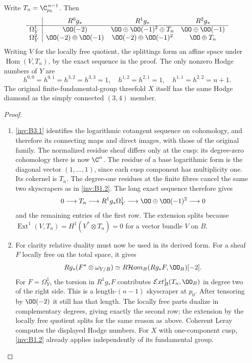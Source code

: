 \begin{proposition}\hypertarget{tag-01S8}{}\label{inv:B3.2}

Write $T_n=\C_{p_0}^{\,n-1}$. Then
\[
\begin{array}{c|ccc}
 &R^0g_*&R^1g_*&R^2g_*\\\hline
\Omega^1_Y&\OO(-2)&\OO\oplus\OO(-1)^2\oplus T_n&\OO\oplus\OO(-1)\\
\Omega^2_Y&\OO(-2)\oplus\OO(-1)&\OO(-2)\oplus\OO(-1)^2&\OO\oplus T_n
\end{array}
\]
Writing $V$ for the locally free quotient, the splittings form an
affine space under $\operatorname{Hom}(V,T_n)$, by the exact
sequence in the proof.
The only nonzero Hodge numbers of $Y$ are
\[
h^{0,0}=h^{0,1}=h^{3,2}=h^{3,3}=1,\quad
h^{1,2}=h^{2,1}=1,\quad h^{1,1}=h^{2,2}=n+1.
\]
The original finite-fundamental-group threefold $X$ itself has the
same Hodge diamond as the simply connected $(3,4)$ member.
\end{proposition}


\begin{proof}
\begin{enumerate}[label=\arabic*.,leftmargin=*]
\item \ref{inv:B3.1} identifies the logarithmic cotangent sequence on cohomology,
and therefore its connecting maps and direct images, with those of
the original family. The normalized residue sheaf differs only at
the cusp: its degree-zero cohomology there is now $\C^n$.
The residue of a base logarithmic form is the diagonal vector
$(1,\ldots,1)$, since each cusp component has multiplicity one.
Its cokernel is $T_n$. The degree-one residues at the finite fibres
cancel the same two skyscrapers as in \ref{inv:B1.2}. The long exact sequence
therefore gives
\[
0\longrightarrow T_n\longrightarrow R^1g_*\Omega^1_Y
\longrightarrow\OO\oplus\OO(-1)^2\longrightarrow0
\]
and the remaining entries of the first row. The extension splits
because $\operatorname{Ext}^1(V,T_n)=H^1(V^*\otimes T_n)=0$
for a vector bundle $V$ on $B$.

\item For clarity relative duality must now be used in its derived form.
For a sheaf $F$ locally free on the total space, it gives
\[
Rg_*(F^*\otimes\omega_{Y/B})
\simeq R\mathcal Hom_B(Rg_*F,\OO_B)[-2].
\]
For $F=\Omega^1_Y$, the torsion in $R^1g_*F$ contributes
$\mathcal Ext^1_B(T_n,\OO_B)$ in degree two of the right side.
This is a length-$(n-1)$ skyscraper at $p_0$. After tensoring by
$\OO(-2)$ it still has that length. The locally free parts dualize
in complementary degrees, giving exactly the second row; the
extension by the locally free quotient splits for the same reason
as above. Coherent Leray computes the displayed Hodge numbers.
For $X$ with one-component cusp, \ref{inv:B1.2} already applies independently
of its fundamental group.
\end{enumerate}
\end{proof}